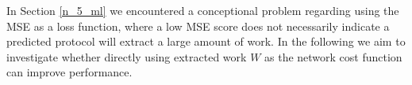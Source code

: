 In Section \ref{n_5_ml} we encountered a conceptional problem regarding using the MSE as a loss function, where a low MSE score does not necessarily indicate a predicted protocol will extract a large amount of work.
In the following we aim to investigate whether directly using extracted work $W$ as the network cost function can improve performance.
